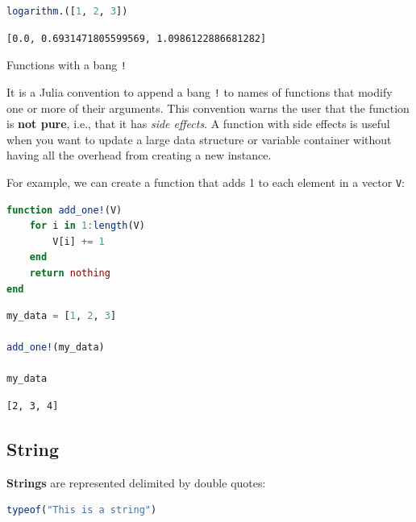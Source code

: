 \documentclass[
  notoc %
]{tufte-book}
\makeatletter
\newcommand{\passthrough}[1]{#1}
\renewcommand\subsubsection{%
\@startsection{subsubsection}{3}{\z@ }{-3.25ex\@plus -1ex \@minus -.2ex}{1.5ex \@plus .2ex}{\normalfont \normalsize \bfseries }
}
\makeatother
\begin{document}
\begin{lstlisting}[language=Julia]
logarithm.([1, 2, 3])
\end{lstlisting}

\begin{lstlisting}[language=Output]
[0.0, 0.6931471805599569, 1.0986122886681282]
\end{lstlisting}

\hypertarget{sec:function_bang}{%
\subsubsection{\texorpdfstring{Functions with a bang
\texttt{!}}{Functions with a bang !}}\label{sec:function_bang}}

It is a Julia convention to append a bang \passthrough{\lstinline"!"} to
names of functions that modify one or more of their arguments. This
convention warns the user that the function is \textbf{not pure}, i.e.,
that it has \emph{side effects}. A function with side effects is useful
when you want to update a large data structure or variable container
without having all the overhead from creating a new instance.

For example, we can create a function that adds 1 to each element in a
vector \passthrough{\lstinline!V!}:

\begin{lstlisting}[language=Julia]
function add_one!(V)
    for i in 1:length(V)
        V[i] += 1
    end
    return nothing
end
\end{lstlisting}

\begin{lstlisting}[language=Julia]
my_data = [1, 2, 3]

add_one!(my_data)

my_data
\end{lstlisting}

\begin{lstlisting}[language=Output]
[2, 3, 4]
\end{lstlisting}

\hypertarget{sec:string}{%
\subsection{String}\label{sec:string}}

\textbf{Strings} are represented delimited by double quotes:

\begin{lstlisting}[language=Julia]
typeof("This is a string")
\end{lstlisting}
\end{document}
